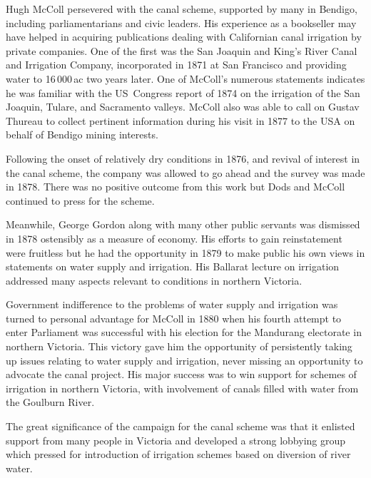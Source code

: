 Hugh McColl persevered with the canal scheme, supported by many in
Bendigo, including parliamentarians and civic leaders.  His experience
as a bookseller may have helped in acquiring publications dealing with
Californian canal irrigation by private companies.  One of the first
was the San Joaquin and King's River Canal and Irrigation Company,
incorporated in 1871 at San Francisco and providing water to
16\,000\,ac two years later.  One of McColl's numerous statements
indicates he was familiar with the US~Congress report of 1874 on the
irrigation of the San Joaquin, Tulare, and Sacramento valleys.  McColl
also was able to call on Gustav Thureau to collect pertinent
information during his visit in 1877 to the USA on behalf of Bendigo
mining interests.

Following the onset of relatively dry conditions in 1876, and revival
of interest in the canal scheme, the company was allowed to go ahead
and the survey was made in 1878.  There was no positive outcome from
this work but Dods and McColl continued to press for the
scheme.

Meanwhile, George Gordon along with many other public servants was
dismissed in 1878 ostensibly as a measure of economy.  His efforts to
gain reinstatement were fruitless but he had the opportunity in 1879
to make public his own views in statements on water supply and
irrigation.  His Ballarat lecture on irrigation addressed many aspects
relevant to conditions in northern Victoria.

Government indifference to the problems of water supply and irrigation
was turned to personal advantage for McColl in 1880 when his fourth
attempt to enter Parliament was successful with his election for the
Mandurang electorate in northern Victoria.  This victory gave him the
opportunity of persistently taking up issues relating to water supply
and irrigation, never missing an opportunity to advocate the canal
project.  His major success was to win support for schemes of
irrigation in northern Victoria, with involvement of canals filled
with water from the Goulburn River.

The great significance of the campaign for the canal scheme was that
it enlisted support from many people in Victoria and developed a
strong lobbying group which pressed for introduction of irrigation
schemes based on diversion of river water.

